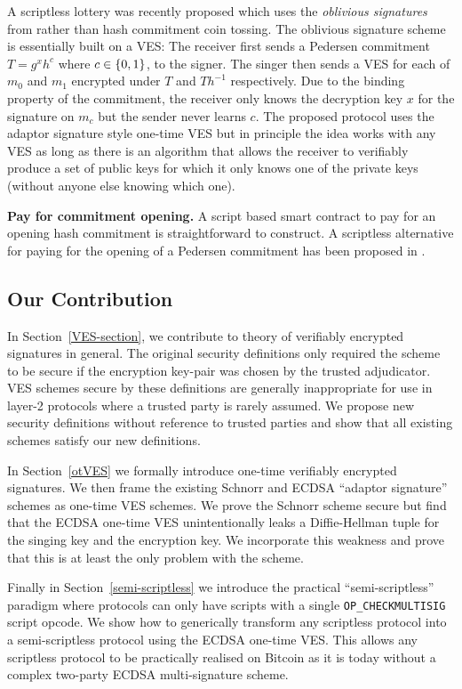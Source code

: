 \documentclass[fullpage]{article}
\theoremstyle{definition}
\begin{document}
A scriptless lottery was recently proposed\cite{fournier_lottery} which uses the \emph{oblivious signatures} from \cite{1-of-n-oblivious-signatures} rather than hash commitment coin tossing. The oblivious signature scheme is essentially built on a VES: The receiver first sends a Pedersen commitment $T = g^xh^c$ where $c \in \{0,1\}$, to the signer. The singer then sends a VES for each of $m_0$ and $m_1$ encrypted under $T$ and $Th^{-1}$ respectively. Due to the binding property of the commitment, the receiver only knows the decryption key $x$ for the signature on $m_c$ but the sender never learns $c$. The proposed protocol uses the adaptor signature style one-time VES but in principle the idea works with any VES as long as there is an algorithm that allows the receiver to verifiably produce a set of public keys for which it only knows one of the private keys (without anyone else knowing which one).

\hfill \break  \textbf{Pay for commitment opening.} A script based smart contract to pay for an opening hash commitment is straightforward to construct. A scriptless alternative for paying for the opening of a Pedersen commitment has been proposed in \cite{pay-for-pedersen}.

\subsection{Our Contribution}

In Section~\ref{VES-section}, we contribute to theory of verifiably encrypted signatures in general. The original security definitions\cite{Boneh:2003:AVE:1766171.1766207} only required the scheme to be secure if the encryption key-pair was chosen by the trusted adjudicator. VES schemes secure by these definitions are generally inappropriate for use in layer-2 protocols where a  trusted party is rarely assumed. We propose new security definitions without reference to trusted parties and show that all existing schemes satisfy our new definitions.

In Section~\ref{otVES} we formally introduce one-time verifiably encrypted signatures. We then frame the existing Schnorr and ECDSA ``adaptor signature'' schemes as one-time VES schemes. We prove the Schnorr scheme secure but find that the ECDSA one-time VES unintentionally leaks a Diffie-Hellman tuple for the singing key and the encryption key. We incorporate this weakness and prove that this is at least the only problem with the scheme.

Finally in Section~\ref{semi-scriptless} we introduce the practical ``semi-scriptless'' paradigm where protocols can only have scripts with a single \texttt{OP\_CHECKMULTISIG} script opcode. We show how to generically transform any scriptless protocol into a semi-scriptless protocol using the ECDSA one-time VES\@. This allows any scriptless protocol to be practically realised on Bitcoin as it is today without a complex two-party ECDSA multi-signature scheme.
\end{document}
